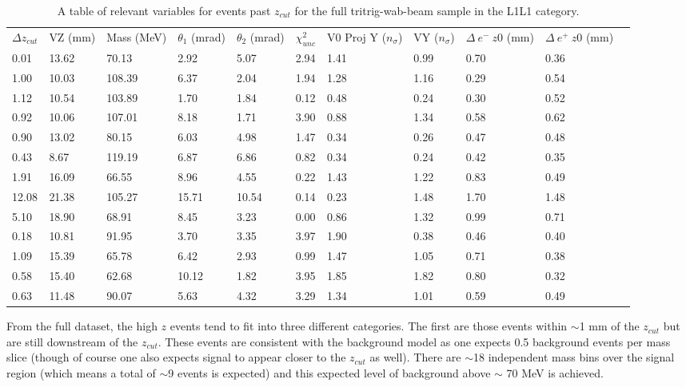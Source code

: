 \begin{table}[t]
\centering
\tabcolsep=0.09cm
\begin{tabular}{lllllllllll}

\hline

$\Delta z_{cut}$ & VZ (mm) & Mass (MeV) & $\theta_{1}$ (mrad) & $\theta_{2}$ (mrad) & $\chi^2_{unc}$ & V0 Proj Y ($n_{\sigma}$) & VY ($n_{\sigma}$) & $\Delta \ e^- \ z0$ (mm) & $\Delta \ e^+ \ z0$ (mm) \\
0.01 & 13.62 & 70.13 & 2.92 & 5.07 & 2.94 & 1.41 & 0.99 & 0.70 & 0.36 \\ 
1.00 & 10.03 & 108.39 & 6.37 & 2.04 & 1.94 & 1.28 & 1.16 & 0.29 & 0.54 \\ 
1.12 & 10.54 & 103.89 & 1.70 & 1.84 & 0.12 & 0.48 & 0.24 & 0.30 & 0.52 \\ 
0.92 & 10.06 & 107.01 & 8.18 & 1.71 & 3.90 & 0.88 & 1.34 & 0.58 & 0.62 \\ 
0.90 & 13.02 & 80.15 & 6.03 & 4.98 & 1.47 & 0.34 & 0.26 & 0.47 & 0.48 \\ 
0.43 & 8.67 & 119.19 & 6.87 & 6.86 & 0.82 & 0.34 & 0.24 & 0.42 & 0.35 \\ 
1.91 & 16.09 & 66.55 & 8.96 & 4.55 & 0.22 & 1.43 & 1.22 & 0.83 & 0.49 \\ 
12.08 & 21.38 & 105.27 & 15.71 & 10.54 & 0.14 & 0.23 & 1.48 & 1.70 & 1.48 \\ 
5.10 & 18.90 & 68.91 & 8.45 & 3.23 & 0.00 & 0.86 & 1.32 & 0.99 & 0.71 \\ 
0.18 & 10.81 & 91.95 & 3.70 & 3.35 & 3.97 & 1.90 & 0.38 & 0.46 & 0.40 \\ 
1.09 & 15.39 & 65.78 & 6.42 & 2.93 & 0.99 & 1.47 & 1.05 & 0.71 & 0.38 \\ 
0.58 & 15.40 & 62.68 & 10.12 & 1.82 & 3.95 & 1.85 & 1.82 & 0.80 & 0.32 \\ 
0.63 & 11.48 & 90.07 & 5.63 & 4.32 & 3.29 & 1.34 & 1.01 & 0.59 & 0.49 \\

\hline

\hline
\end{tabular}
\caption{A table of relevant variables for events past $z_{cut}$ for the full tritrig-wab-beam sample in the L1L1 category.}
\label{tab:highZ_L1L1_tritrig-wab-beam}
\end{table}

From the full dataset, the high $z$ events tend to fit into three different categories. The first are those events within $\sim$1 mm of the $z_{cut}$ but are still downstream of the $z_{cut}$. These events are consistent with the background model as one expects 0.5 background events per mass slice (though of course one also expects signal to appear closer to the $z_{cut}$ as well). There are $\sim$18 independent mass bins over the signal region (which means a total of $\sim$9 events is expected) and this expected level of background above $\sim$ 70 MeV is achieved. 

